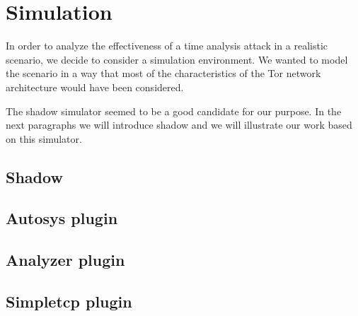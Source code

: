 \section{Simulation}
\label{sec:simulation}
In order to analyze the effectiveness of a time analysis attack in a
realistic scenario, we decide to consider a simulation environment.
We wanted to model the scenario in a way that most of the
characteristics of the Tor network architecture would have been
considered.

The shadow simulator seemed to be a good candidate for our purpose. In
the next paragraphs we will introduce shadow and we will illustrate our
work based on this simulator.
 
\subsection{Shadow}
\subsection{Autosys plugin}
\subsection{Analyzer plugin}
\subsection{Simpletcp plugin}
